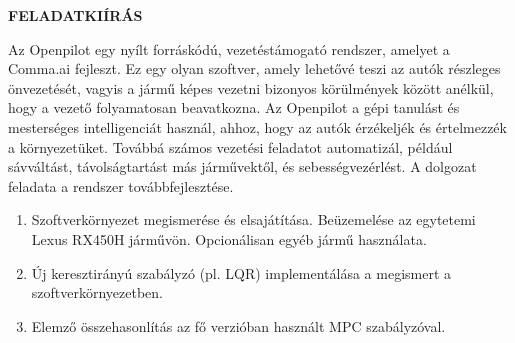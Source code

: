 \clearpage

\begin{center}
\large
\textbf{FELADATKIÍRÁS}\\
\end{center}
Az Openpilot egy nyílt forráskódú, vezetéstámogató rendszer, amelyet a Comma.ai fejleszt. 
Ez egy olyan szoftver, amely lehetővé teszi az autók részleges önvezetését, vagyis a jármű képes 
vezetni bizonyos körülmények között anélkül, hogy a vezető folyamatosan beavatkozna. 
Az Openpilot a gépi tanulást és mesterséges intelligenciát használ, ahhoz, hogy az autók érzékeljék 
és értelmezzék a környezetüket. Továbbá számos vezetési feladatot automatizál, például sávváltást,
 távolságtartást más járművektől, és sebességvezérlést. A dolgozat feladata a rendszer 
 továbbfejlesztése. 

\begin{enumerate}
\item Szoftverkörnyezet megismerése és elsajátítása. Beüzemelése az egytetemi Lexus RX450H járművön. Opcionálisan egyéb jármű használata.
\item Új keresztirányú szabályzó (pl. LQR) implementálása a megismert a szoftverkörnyezetben.  
\item Elemző összehasonlítás az fő verzióban használt MPC szabályzóval. 
\end{enumerate}

%

